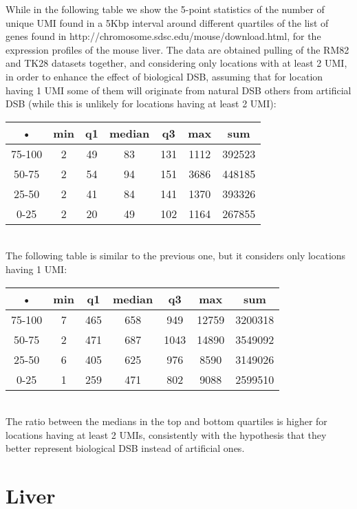 \documentclass[11pt,a4paper]{article}
\begin{document}
While in the following table we show the 5-point statistics of the 
number of unique UMI found in a 5Kbp interval around different quartiles 
of the list of genes found in http://chromosome.sdsc.edu/mouse/download.html, for the expression profiles of the mouse liver. The data are obtained pulling 
of the RM82 and TK28 datasets together, and considering only locations with 
at least 2 UMI, in order to enhance the effect of biological DSB, assuming 
that for location having 1 UMI some of them will originate from natural DSB others from artificial DSB (while this is unlikely for locations having at least 2 UMI):
\\
\begin{tabular}{|c|c|c|c|c|c|c|}
\hline 
• & min & q1 & median & q3 & max & sum \\ 
\hline 
75-100 & 2 & 49 & 83 & 131 & 1112 & 392523 \\ 
\hline 
50-75 & 2 & 54 & 94 & 151 & 3686 & 448185 \\ 
\hline 
25-50 & 2 & 41 & 84 & 141 & 1370 & 393326 \\ 
\hline 
0-25 & 2 & 20 & 49 & 102 & 1164 & 267855 \\ 
\hline 
\end{tabular} 
\\
The following table is similar to the previous one, but it considers only 
locations having 1 UMI:
\\
\begin{tabular}{|c|c|c|c|c|c|c|}
\hline 
• & min & q1 & median & q3 & max & sum \\ 
\hline 
75-100 & 7 & 465 & 658 & 949 & 12759 & 3200318 \\ 
\hline 
50-75 & 2 & 471 & 687 & 1043 & 14890 & 3549092 \\ 
\hline 
25-50 & 6 & 405 & 625 & 976 & 8590 & 3149026 \\ 
\hline 
0-25 & 1 & 259 & 471 & 802 & 9088 & 2599510 \\ 
\hline 
\end{tabular} 
\\
The ratio between the medians in the top and bottom quartiles is 
higher for locations having at least 2 UMIs, consistently with the hypothesis 
that they better represent biological DSB instead of artificial ones. 

\section{Liver}
\end{document}

